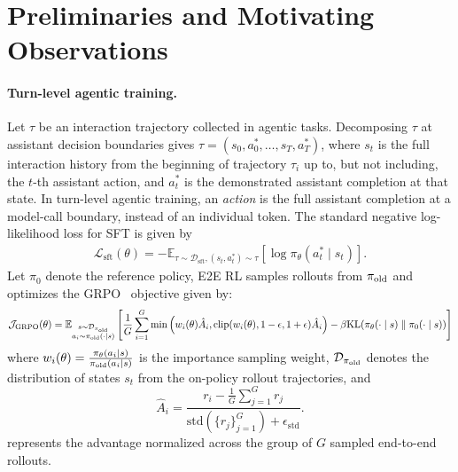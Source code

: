 \section{Preliminaries and Motivating Observations}
\label{sec:prelim}

\paragraph{Turn-level agentic training.}
Let $\tau$ be an interaction trajectory collected in agentic tasks. Decomposing $\tau$ at assistant decision boundaries gives $\tau=(s_{0},a_{0}^*,\ldots,s_{T},a_{T}^*)$, where $s_{t}$ is the full interaction history from the beginning of trajectory $\tau_i$ up to, but not including, the $t$-th assistant action, and $a_{t}^*$ is the demonstrated assistant completion at that state.
In turn-level agentic training, an \emph{action} is the full assistant completion at a model-call boundary, instead of an individual token. The standard negative log-likelihood loss for SFT is given by
\begin{align*}
    \mathcal{L}_{\mathrm{sft}}(\theta) = -\mathbb{E}_{\tau \sim \mathcal{D}_{\mathrm{sft}}, (s_t,a_t^*) \sim \tau} [\log \pi_\theta(a^*_t \mid s_t)].
\end{align*}
Let $\pi_0$ denote the reference policy, E2E RL samples rollouts from $\pi_{\mathrm{old}}$ and optimizes the GRPO~\citep{shao2024deepseekmath} objective given by:
\begin{align*}
    \mathcal{J}_{\mathrm{GRPO}}(\theta) = \mathbb{E}_{\substack{s \sim \mathcal{D}_{\pi_{\mathrm{old}}} \\ a_i \sim \pi_{\mathrm{old}}(\cdot \mid s)}} \left[ \frac{1}{G} \sum_{i=1}^G \min \left( w_i(\theta) \hat{A}_i, \operatorname{clip}(w_i(\theta), 1-\epsilon, 1+\epsilon) \hat{A}_i \right) - \beta \mathrm{KL}(\pi_\theta(\cdot \mid s) \parallel \pi_0(\cdot \mid s)) \right]
\end{align*}
where $w_i(\theta) = \frac{\pi_\theta(a_i \mid s)}{\pi_{\mathrm{old}}(a_i \mid s)}$ is the importance sampling weight, $\mathcal{D}_{\pi_{\mathrm{old}}}$ denotes the distribution of states $s_t$ from the on-policy rollout trajectories, and 
\begin{equation}
\hat{A}_i
=
\frac{
r_i-\frac{1}{G}\sum_{j=1}^G r_j
}{
\mathrm{std}(\{r_j\}_{j=1}^G) + \epsilon_{\mathrm{std}}
}.
\label{eq:group_adv}
\end{equation}
represents the advantage normalized across the group of $G$ sampled end-to-end rollouts.

